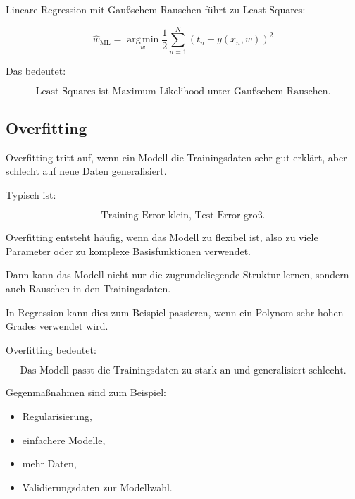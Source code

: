 \documentclass[11pt,a4paper]{scrartcl}
\begin{document}
\begin{answerbox}
    Lineare Regression mit Gaußschem Rauschen führt zu Least Squares:

    \[
        \boxed{
            \hat w_{\mathrm{ML}}
            =
            \operatorname*{arg\,min}_{w}
            \frac{1}{2}
            \sum_{n=1}^{N}
            \left(t_n-y(x_n,w)\right)^2
        }
    \]

    Das bedeutet:

    \[
        \boxed{
            \text{Least Squares ist Maximum Likelihood unter Gaußschem Rauschen.}
        }
    \]
\end{answerbox}

\subsection{Overfitting}

\begin{notebox}
    Overfitting tritt auf, wenn ein Modell die Trainingsdaten sehr gut erklärt,
    aber schlecht auf neue Daten generalisiert.

    Typisch ist:

    \[
        \text{Training Error klein, Test Error groß.}
    \]
\end{notebox}

\begin{solutionbox}
    Overfitting entsteht häufig, wenn das Modell zu flexibel ist, also zu viele
    Parameter oder zu komplexe Basisfunktionen verwendet.

    Dann kann das Modell nicht nur die zugrundeliegende Struktur lernen, sondern
    auch Rauschen in den Trainingsdaten.

    In Regression kann dies zum Beispiel passieren, wenn ein Polynom sehr hohen
    Grades verwendet wird.
\end{solutionbox}

\begin{answerbox}
    Overfitting bedeutet:

    \[
        \boxed{
            \text{Das Modell passt die Trainingsdaten zu stark an und generalisiert schlecht.}
        }
    \]

    Gegenmaßnahmen sind zum Beispiel:

    \begin{itemize}
        \item Regularisierung,
        \item einfachere Modelle,
        \item mehr Daten,
        \item Validierungsdaten zur Modellwahl.
    \end{itemize}
\end{answerbox}
\end{document}
